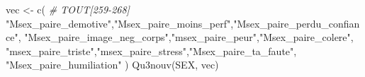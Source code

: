 \documentclass[
]{article}
\newenvironment{Shaded}{\begin{snugshade}}{\end{snugshade}}
\newcommand{\CommentTok}[1]{\textcolor[rgb]{0.56,0.35,0.01}{\textit{#1}}}
\newcommand{\FunctionTok}[1]{\textcolor[rgb]{0.00,0.00,0.00}{#1}}
\newcommand{\NormalTok}[1]{#1}
\newcommand{\OtherTok}[1]{\textcolor[rgb]{0.56,0.35,0.01}{#1}}
\newcommand{\StringTok}[1]{\textcolor[rgb]{0.31,0.60,0.02}{#1}}
\begin{document}
\begin{Shaded}
\begin{Highlighting}[]
\NormalTok{vec }\OtherTok{\textless{}{-}} \FunctionTok{c}\NormalTok{(   }\CommentTok{\# TOUT[259{-}268]}
  \StringTok{"Msex\_paire\_demotive"}\NormalTok{,}\StringTok{"Msex\_paire\_moins\_perf"}\NormalTok{,}\StringTok{"Msex\_paire\_perdu\_confiance"}\NormalTok{,}
  \StringTok{"Msex\_paire\_image\_neg\_corps"}\NormalTok{,}\StringTok{"msex\_paire\_peur"}\NormalTok{,}\StringTok{"Msex\_paire\_colere"}\NormalTok{,}
  \StringTok{"msex\_paire\_triste"}\NormalTok{,}\StringTok{"msex\_paire\_stress"}\NormalTok{,}\StringTok{"Msex\_paire\_ta\_faute"}\NormalTok{,}
  \StringTok{"Msex\_paire\_humiliation"}
\NormalTok{  )}
\FunctionTok{Qu3nouv}\NormalTok{(SEX, vec)}
\end{Highlighting}
\end{Shaded}
\end{document}
